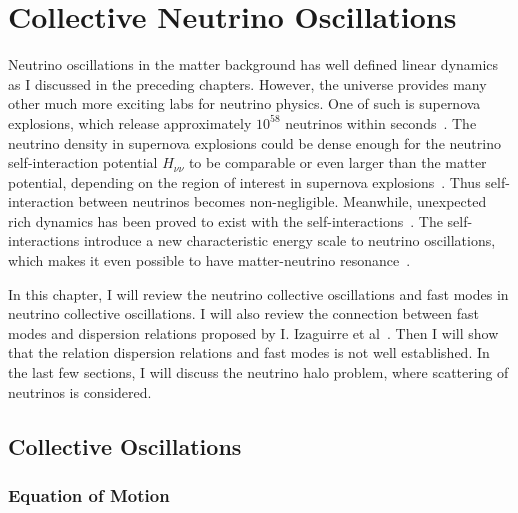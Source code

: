 
\chapter{\label{chap:collective}Collective Neutrino Oscillations}

Neutrino oscillations in the matter background has well defined linear dynamics as I discussed in the preceding chapters. However, the universe provides many other much more exciting labs for neutrino physics. One of such is supernova explosions, which release approximately $10^{58}$ neutrinos within seconds~\cite{Bahcall1987}. The neutrino density in supernova explosions could be dense enough for the neutrino self-interaction potential $H_{\nu\nu}$ to be comparable or even larger than the matter potential, depending on the region of interest in supernova explosions~\cite{Flowers1976a}. Thus self-interaction between neutrinos becomes non-negligible. Meanwhile, unexpected rich dynamics has been proved to exist with the self-interactions~\cite{Duan2010, Duan2006}. The self-interactions introduce a new characteristic energy scale to neutrino oscillations, which makes it even possible to have matter-neutrino resonance~\cite{Malkus2014, Vaananen2015, Wu2015}.

In this chapter, I will review the neutrino collective oscillations and fast modes in neutrino collective oscillations. I will also review the connection between fast modes and dispersion relations proposed by I. Izaguirre et al~\cite{Izaguirre2016a}. Then I will show that the relation dispersion relations and fast modes is not well established. In the last few sections, I will discuss the neutrino halo problem, where scattering of neutrinos is considered.


\section{\label{chap:collective-sec:collective}Collective Oscillations}


\subsection{Equation of Motion}

